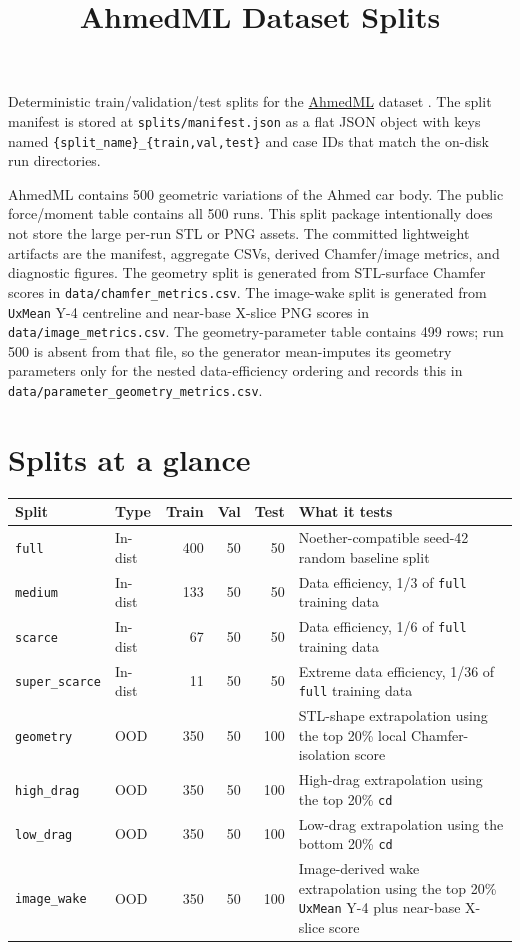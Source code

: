 \documentclass[10pt]{article}
\title{\vspace{-1.2em}\textbf{AhmedML Dataset Splits}}
\author{}
\date{}
\newcommand{\code}[1]{\texttt{#1}}
\newcommand{\splitkey}[1]{\texttt{#1}}
\begin{document}
\maketitle
\vspace{-2.0em}

Deterministic train/validation/test splits for the
\href{https://huggingface.co/datasets/neashton/ahmedml}{AhmedML} dataset
\cite{ahmedml_dataset}. The split manifest is stored at
\code{splits/manifest.json} as a flat JSON object with keys named
\code{\{split\_name\}\_\{train,val,test\}} and case IDs that match the
on-disk run directories.

AhmedML contains 500 geometric variations of the Ahmed car body. The public
force/moment table contains all 500 runs. This split package intentionally does
not store the large per-run STL or PNG assets. The committed lightweight
artifacts are the manifest, aggregate CSVs, derived Chamfer/image metrics, and
diagnostic figures. The geometry split is generated from STL-surface Chamfer
scores in \code{data/chamfer\_metrics.csv}. The image-wake split is generated
from \code{UxMean} Y-4 centreline and near-base X-slice PNG scores in
\code{data/image\_metrics.csv}. The geometry-parameter table contains 499 rows;
run 500 is absent from that file, so the generator mean-imputes its geometry
parameters only for the nested data-efficiency ordering and records this in
\code{data/parameter\_geometry\_metrics.csv}.

\section*{Splits at a glance}

\begin{tabularx}{\textwidth}{@{}l l r r r X@{}}
\toprule
Split & Type & Train & Val & Test & What it tests \\
\midrule
\splitkey{full} & In-dist & 400 & 50 & 50 & Noether-compatible seed-42 random baseline split \\
\splitkey{medium} & In-dist & 133 & 50 & 50 & Data efficiency, 1/3 of \splitkey{full} training data \\
\splitkey{scarce} & In-dist & 67 & 50 & 50 & Data efficiency, 1/6 of \splitkey{full} training data \\
\splitkey{super\_scarce} & In-dist & 11 & 50 & 50 & Extreme data efficiency, 1/36 of \splitkey{full} training data \\
\splitkey{geometry} & OOD & 350 & 50 & 100 & STL-shape extrapolation using the top 20\% local Chamfer-isolation score \\
\splitkey{high\_drag} & OOD & 350 & 50 & 100 & High-drag extrapolation using the top 20\% \code{cd} \\
\splitkey{low\_drag} & OOD & 350 & 50 & 100 & Low-drag extrapolation using the bottom 20\% \code{cd} \\
\splitkey{image\_wake} & OOD & 350 & 50 & 100 & Image-derived wake extrapolation using the top 20\% \code{UxMean} Y-4 plus near-base X-slice score \\
\bottomrule
\end{tabularx}
\end{document}
